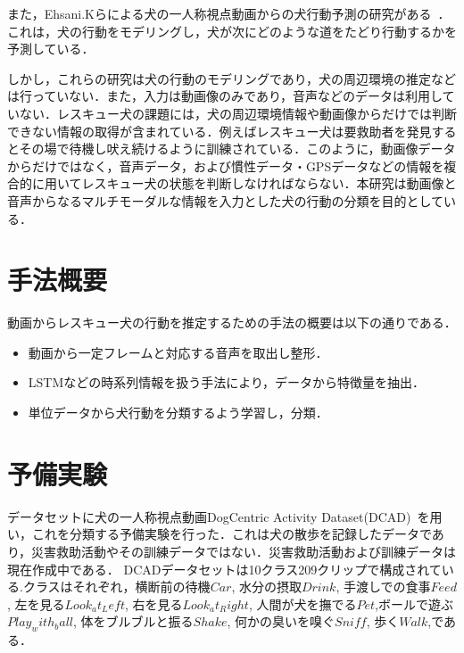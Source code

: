 \documentclass[twocolumn, a4paper]{UECIEresume}
\begin{document}
また，Ehsani.Kらによる犬の一人称視点動画からの犬行動予測の研究がある~\cite{whoretthedog}．これは，犬の行動をモデリングし，犬が次にどのような道をたどり行動するかを予測している．

しかし，これらの研究は犬の行動のモデリングであり，犬の周辺環境の推定などは行っていない．また，入力は動画像のみであり，音声などのデータは利用していない．レスキュー犬の課題には，犬の周辺環境情報や動画像からだけでは判断できない情報の取得が含まれている．例えばレスキュー犬は要救助者を発見するとその場で待機し吠え続けるように訓練されている．このように，動画像データからだけではなく，音声データ，および慣性データ・GPSデータなどの情報を複合的に用いてレスキュー犬の状態を判断しなければならない．本研究は動画像と音声からなるマルチモーダルな情報を入力とした犬の行動の分類を目的としている． 

\section{手法概要}
動画からレスキュー犬の行動を推定するための手法の概要は以下の通りである．
\begin{itemize}
 \item 動画から一定フレームと対応する音声を取出し整形．
 \item LSTMなどの時系列情報を扱う手法により，データから特徴量を抽出．
 \item 単位データから犬行動を分類するよう学習し，分類．
\end{itemize}

\section{予備実験}
データセットに犬の一人称視点動画DogCentric Activity Dataset(DCAD)~\cite{yumi2014first}を用い，これを分類する予備実験を行った．これは犬の散歩を記録したデータであり，災害救助活動やその訓練データではない．災害救助活動および訓練データは現在作成中である．
DCADデータセットは10クラス209クリップで構成されている.クラスはそれぞれ，横断前の待機\(Car\), 水分の摂取\(Drink\), 手渡しでの食事\(Feed\), 左を見る\(Look_at_Left\), 右を見る\(Look_at_Right\), 人間が犬を撫でる\(Pet\),ボールで遊ぶ\(Play_with_ball\), 体をブルブルと振る\(Shake\), 何かの臭いを嗅ぐ\(Sniff\), 歩く\(Walk\),である．
\end{document}
